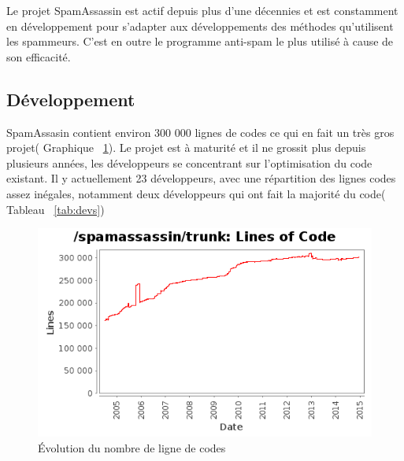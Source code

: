 \documentclass[a4paper,11pt]{article}
\begin{document}
Le projet SpamAssassin est actif depuis plus d'une décennies et est constamment en développement 
pour s'adapter aux développements des méthodes qu'utilisent les spammeurs. C'est en outre le programme anti-spam le plus utilisé à cause de son efficacité.

\subsection{Développement}

SpamAssasin contient environ 300 000 lignes de codes ce qui en fait un très gros projet( Graphique ~\ref{fig:code}).
Le projet est à maturité et il ne grossit plus depuis plusieurs années, les développeurs se concentrant sur l'optimisation du code existant.
Il y actuellement 23 développeurs, avec une répartition des lignes codes assez inégales, notamment deux développeurs qui ont fait la majorité du code( Tableau ~\ref{tab:devs})

\begin{figure}
 \includegraphics[width=\textwidth]{annexes/lignes.png}
  \caption{Évolution du nombre de ligne de codes}
  \label {fig:code}
\end{figure}
\end{document}
